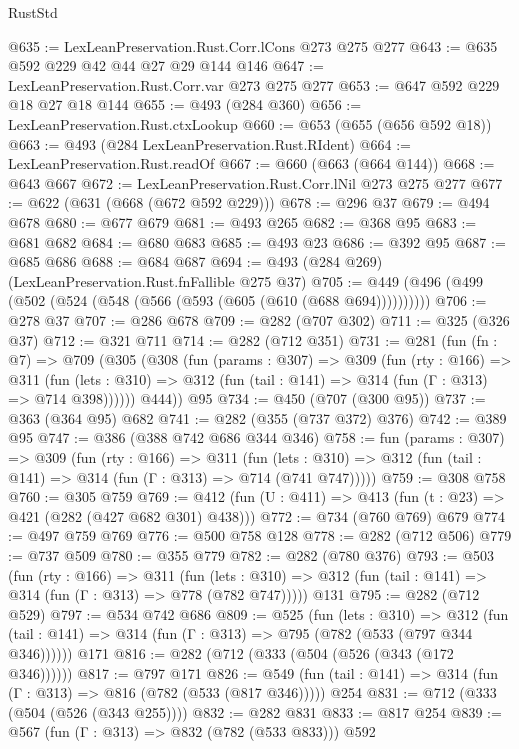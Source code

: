 \begin{lexlean}{RustStd}
\begin{coremodule}
@635 := LexLeanPreservation.Rust.Corr.lCons @273 @275 @277
@643 := @635 @592 @229 @42 @44 @27 @29 @144 @146
@647 := LexLeanPreservation.Rust.Corr.var @273 @275 @277
@653 := @647 @592 @229 @18 @27 @18 @144
@655 := @493 (@284 @360)
@656 := LexLeanPreservation.Rust.ctxLookup
@660 := @653 (@655 (@656 @592 @18))
@663 := @493 (@284 LexLeanPreservation.Rust.RIdent)
@664 := LexLeanPreservation.Rust.readOf
@667 := @660 (@663 (@664 @144))
@668 := @643 @667
@672 := LexLeanPreservation.Rust.Corr.lNil @273 @275 @277
@677 := @622 (@631 (@668 (@672 @592 @229)))
@678 := @296 @37
@679 := @494 @678
@680 := @677 @679
@681 := @493 @265
@682 := @368 @95
@683 := @681 @682
@684 := @680 @683
@685 := @493 @23
@686 := @392 @95
@687 := @685 @686
@688 := @684 @687
@694 := @493 (@284 @269) (LexLeanPreservation.Rust.fnFallible @275 @37)
@705 := @449 (@496 (@499 (@502 (@524 (@548 (@566 (@593 (@605 (@610 (@688 @694))))))))))
@706 := @278 @37
@707 := @286 @678
@709 := @282 (@707 @302)
@711 := @325 (@326 @37)
@712 := @321 @711
@714 := @282 (@712 @351)
@731 := @281
    (fun (fn : @7) =>
    @709
      (@305
        (@308
          (fun (params : @307) =>
          @309
            (fun (rty : @166) =>
            @311
              (fun (lets : @310) =>
              @312 (fun (tail : @141) => @314 (fun (Γ : @313) => @714 @398))))))
        @444))
    @95
@734 := @450 (@707 (@300 @95))
@737 := @363 (@364 @95) @682
@741 := @282 (@355 (@737 @372) @376)
@742 := @389 @95
@747 := @386 (@388 @742 @686 @344 @346)
@758 := fun (params : @307) =>
  @309
    (fun (rty : @166) =>
    @311
      (fun (lets : @310) => @312 (fun (tail : @141) => @314 (fun (Γ : @313) => @714 (@741 @747)))))
@759 := @308 @758
@760 := @305 @759
@769 := @412 (fun (U : @411) => @413 (fun (t : @23) => @421 (@282 (@427 @682 @301) @438)))
@772 := @734 (@760 @769) @679
@774 := @497 @759 @769
@776 := @500 @758 @128
@778 := @282 (@712 @506)
@779 := @737 @509
@780 := @355 @779
@782 := @282 (@780 @376)
@793 := @503
    (fun (rty : @166) =>
    @311
      (fun (lets : @310) => @312 (fun (tail : @141) => @314 (fun (Γ : @313) => @778 (@782 @747)))))
    @131
@795 := @282 (@712 @529)
@797 := @534 @742 @686
@809 := @525
    (fun (lets : @310) =>
    @312 (fun (tail : @141) => @314 (fun (Γ : @313) => @795 (@782 (@533 (@797 @344 @346))))))
    @171
@816 := @282 (@712 (@333 (@504 (@526 (@343 (@172 @346))))))
@817 := @797 @171
@826 := @549 (fun (tail : @141) => @314 (fun (Γ : @313) => @816 (@782 (@533 (@817 @346))))) @254
@831 := @712 (@333 (@504 (@526 (@343 @255))))
@832 := @282 @831
@833 := @817 @254
@839 := @567 (fun (Γ : @313) => @832 (@782 (@533 @833))) @592

\end{coremodule}
\end{lexlean}
